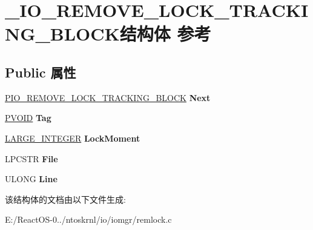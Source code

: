 \hypertarget{struct___i_o___r_e_m_o_v_e___l_o_c_k___t_r_a_c_k_i_n_g___b_l_o_c_k}{}\section{\+\_\+\+I\+O\+\_\+\+R\+E\+M\+O\+V\+E\+\_\+\+L\+O\+C\+K\+\_\+\+T\+R\+A\+C\+K\+I\+N\+G\+\_\+\+B\+L\+O\+C\+K结构体 参考}
\label{struct___i_o___r_e_m_o_v_e___l_o_c_k___t_r_a_c_k_i_n_g___b_l_o_c_k}
\subsection*{Public 属性}
\begin{DoxyCompactItemize}
\item 
\mbox{\label{struct___i_o___r_e_m_o_v_e___l_o_c_k___t_r_a_c_k_i_n_g___b_l_o_c_k_aced669ae7f1feb9440e940f3c2865bc3}} 
\hyperlink{struct___i_o___r_e_m_o_v_e___l_o_c_k___t_r_a_c_k_i_n_g___b_l_o_c_k}{P\+I\+O\+\_\+\+R\+E\+M\+O\+V\+E\+\_\+\+L\+O\+C\+K\+\_\+\+T\+R\+A\+C\+K\+I\+N\+G\+\_\+\+B\+L\+O\+CK} {\bfseries Next}
\item 
\mbox{\label{struct___i_o___r_e_m_o_v_e___l_o_c_k___t_r_a_c_k_i_n_g___b_l_o_c_k_a03335f8225a0a0a138aa90bb31c8ad4b}} 
\hyperlink{interfacevoid}{P\+V\+O\+ID} {\bfseries Tag}
\item 
\mbox{\label{struct___i_o___r_e_m_o_v_e___l_o_c_k___t_r_a_c_k_i_n_g___b_l_o_c_k_a2aad5123f3aee76601623d3c76fdc999}} 
\hyperlink{union___l_a_r_g_e___i_n_t_e_g_e_r}{L\+A\+R\+G\+E\+\_\+\+I\+N\+T\+E\+G\+ER} {\bfseries Lock\+Moment}
\item 
\mbox{\label{struct___i_o___r_e_m_o_v_e___l_o_c_k___t_r_a_c_k_i_n_g___b_l_o_c_k_a10fe7363339c2eb5d281d01bfa1df6c6}} 
L\+P\+C\+S\+TR {\bfseries File}
\item 
\mbox{\label{struct___i_o___r_e_m_o_v_e___l_o_c_k___t_r_a_c_k_i_n_g___b_l_o_c_k_a314cf30768373a2517382cb882c57194}} 
U\+L\+O\+NG {\bfseries Line}
\end{DoxyCompactItemize}


该结构体的文档由以下文件生成\+:\begin{DoxyCompactItemize}
\item 
E\+:/\+React\+O\+S-\/0../ntoskrnl/io/iomgr/remlock.\+c\end{DoxyCompactItemize}

